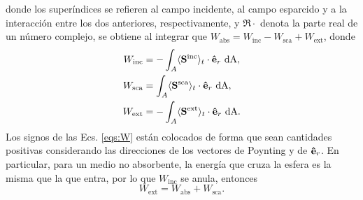 \noindent donde los superíndices se refieren al campo incidente, al campo esparcido y a la interacción entre los dos anteriores, respectivamente, y $\Re{\cdot}$ denota la parte real de un número complejo, se obtiene al integrar que $W_{\text{abs}}=W_{\text{inc}}-W_{\text{sca}}+W_{\text{ext}}$, donde \cite{bohrenAbsorptionScatteringLight2008}
%
\begin{subequations}\label{eqs:W}
	\begin{align} 
		W_{\text{inc}}  &= -\int_{A}\langle\vb{S}^{\text{inc}}\rangle_t\cdot\vu{e}_r\text{ dA}, \label{Wi}\\
		W_{\text{sca}} &= \int_{A}\langle\vb{S^{\text{sca}}}\rangle_t\cdot\vu{e}_r\text{ dA}, \label{Ws} \\ 
		W_{\text{ext}} &= -\int_{A}\langle\vb{S^{\text{ext}}}\rangle_t\cdot\vu{e}_r\text{ dA}. \label{Wext}
	\end{align}
\end{subequations}
%
Los signos de las Ecs. \eqref{eqs:W} están colocados de forma que sean cantidades positivas considerando las direcciones de los vectores de Poynting y de $\vu{e}_r$. En particular, para un medio no absorbente, la energía que cruza la esfera es la misma que la que entra, por lo que $W_{\text{inc}}$ se anula, entonces
%
\begin{equation}
	W_{\text{ext}}=W_{\text{abs}}+W_{\text{sca}}.
	\label{Wext_tot}
\end{equation}

